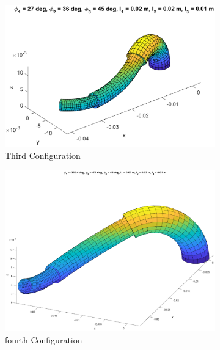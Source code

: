 \documentclass[12pt, twoside]{report}
\begin{document}
\begin{figure}[H]
     \hfill
     \begin{subfigure}[b]{0.3\textwidth}
         \centering
         \includegraphics[width=\textwidth]{TP_1/sample2.eps}
         \caption{Third Configuration}
         \label{fig:Tube3}
     \end{subfigure}
      \hfill
     \begin{subfigure}[b]{0.3\textwidth}
         \centering
         \includegraphics[width=\textwidth]{TP_1/sample3.eps}
         \caption{fourth Configuration}
         \label{fig:Tube4}
     \end{subfigure}
      \hfill
     \begin{subfigure}[b]{0.3\textwidth}
         \centering

\end{subfigure}
\end{figure}
\end{document}
